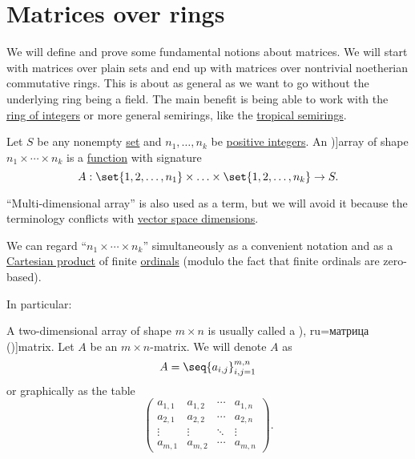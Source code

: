 \section{Matrices over rings}\label{sec:matrices_over_rings}

We will define and prove some fundamental notions about matrices. We will start with matrices over plain sets and end up with matrices over nontrivial noetherian commutative rings. This is about as general as we want to go without the underlying ring being a field. The main benefit is being able to work with the \hyperref[def:integers]{ring of integers} or more general semirings, like the \hyperref[def:tropical_semiring]{tropical semirings}.

\begin{definition}\label{def:array}\mimprovised
  Let \( S \) be any nonempty \hyperref[def:set]{set} and \( n_1, \ldots, n_k \) be \hyperref[def:integer_signum]{positive integers}. An \term[ru=массив (\cite[sec. 40.1]{Тыртышников2007ЛинейнаяАлгебра})]{array} of shape \( n_1 \times \cdots \times n_k \) is a \hyperref[def:function]{function} with signature
  \begin{equation*}
    A: \set{ 1, 2, \ldots, n_1 } \times \ldots \times \set{ 1, 2, \ldots, n_k } \to S.
  \end{equation*}

  \enquote{Multi-dimensional array} is also used as a term, but we will avoid it because the terminology conflicts with \hyperref[thm:vector_space_dimension]{vector space dimensions}.

  We can regard \enquote{\( n_1 \times \cdots \times n_k \)} simultaneously as a convenient notation and as a \hyperref[def:cartesian_product]{Cartesian product} of finite \hyperref[def:ordinal]{ordinals} (modulo the fact that finite ordinals are zero-based).

  In particular:
  \begin{thmenum}
     A two-dimensional array of shape \( m \times n \) is usually called a \term[ru=матрица (\cite[18]{Обрешков1962ВисшаАлгебра}), ru=матрица (\cite[\S 1.1]{Тыртышников2007ЛинейнаяАлгебра})]{matrix}. Let \( A \) be an \( m \times n \)-matrix. We will denote \( A \) as
    \begin{equation*}
      A = \seq{ a_{i,j} }_{i,j=1}^{m,n}
    \end{equation*}
    or graphically as the table
    \begin{equation*}
      \begin{pmatrix}
        a_{1,1} & a_{1,2} & \cdots & a_{1,n} \\
        a_{2,1} & a_{2,2} & \cdots & a_{2,n} \\
        \vdots  & \vdots  & \ddots & \vdots  \\
        a_{m,1} & a_{m,2} & \cdots & a_{m,n}
      \end{pmatrix}.
    \end{equation*}


\end{thmenum}
\end{definition}
